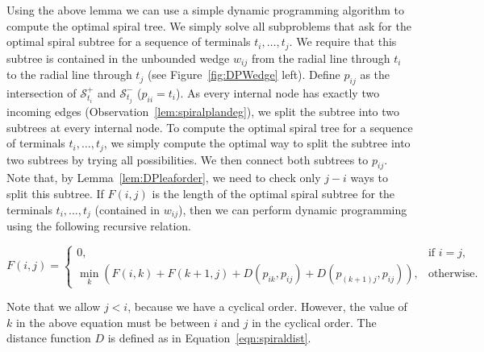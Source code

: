 \documentclass{journalA4}
\begin{document}
\noindent Using the above lemma we can use a simple dynamic programming algorithm to compute the optimal spiral tree. We simply solve all subproblems that ask for the optimal spiral subtree for a sequence of terminals $t_i, \ldots, t_j$. We require that this subtree is contained in the unbounded wedge $w_{ij}$ from the radial line through $t_i$ to the radial line through $t_j$ (see Figure~\ref{fig:DPWedge} left). Define $p_{ij}$ as the intersection of $\mathcal{S}^{+}_{t_i}$ and $\mathcal{S}^{-}_{t_j}$ ($p_{ii} = t_i$). As every internal node has exactly two incoming edges (Observation~\ref{lem:spiralplandeg}), we split the subtree into two subtrees at every internal node. To compute the optimal spiral tree for a sequence of terminals $t_i, \ldots, t_j$, we simply compute the optimal way to split the subtree into two subtrees by trying all possibilities. We then connect both subtrees to $p_{ij}$. Note that, by Lemma~\ref{lem:DPleaforder}, we need to check only $j - i$ ways to split this subtree. If $F(i, j)$ is the length of the optimal spiral subtree for the terminals $t_i, \ldots, t_j$ (contained in $w_{ij}$), then we can perform dynamic programming using the following recursive relation.

\begin{equation}
F(i, j) = \begin{cases} 0, & \mbox{if } i = j, \\ \min_k (F(i, k) + F(k+1, j) + D(p_{ik}, p_{ij}) + D(p_{(k+1)j}, p_{ij})), & \mbox{otherwise.} \end{cases}
\end{equation}

\noindent Note that we allow $j < i$, because we have a cyclical order. However, the value of $k$ in the above equation must be between $i$ and $j$ in the cyclical order. The distance function $D$ is defined as in Equation~\ref{eqn:spiraldist}.
\end{document}
